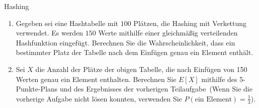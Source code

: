 \documentclass[11pt,a4paper]{article}
\begin{document}
\thispagestyle{empty}
\DeclareRobustCommand{\ttfamily}{\fontencoding{T1}\fontfamily{lmtt}\selectfont}

\newcommand{\quotes}[1]{\glqq{}#1\grqq{}}





\begin{aufgabe}{1}{Hashing}
    \begin{enumerate}
        \item Gegeben sei eine Hashtabelle mit $100$ Plätzen, die Hashing mit Verkettung verwendet.
        Es werden $150$ Werte mithilfe einer gleichmäßig verteilenden Hashfunktion eingefügt.
        Berechnen Sie die Wahrscheinlichkeit, dass ein bestimmter Platz der Tabelle nach dem Einfügen genau ein Element enthält.
        \item Sei $X$ die Anzahl der Plätze der obigen Tabelle, die nach Einfügen von 150 Werten genau ein Element enthalten.
        Berechnen Sie $E[X]$ mithilfe des \quotes{5-Punkte-Plans} und des Ergebnisses der vorherigen Teilaufgabe~(Wenn Sie die vorherige Aufgabe nicht lösen konnten, verwenden Sie $P(\text{ein Element}) = \frac{1}{3}$).
    \end{enumerate}
\end{aufgabe}
\end{document}
